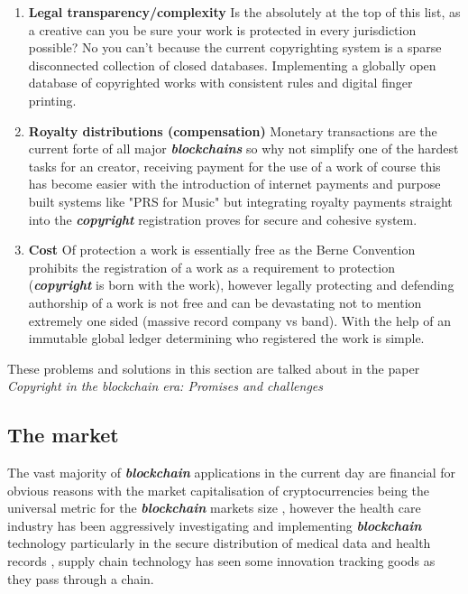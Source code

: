 \documentclass[12pt]{article}
\newcommand{\keyword}[1]{\textbf{\textit{#1}}}
\begin{document}
\begin{enumerate}
	\item \textbf{Legal transparency/complexity} Is the absolutely at the top of this list, as a creative can you be sure your work is protected in every jurisdiction possible? No you can't because the current copyrighting system is a sparse disconnected collection of closed databases. Implementing a globally open database of copyrighted works with consistent rules and digital finger printing. 
	\item \textbf{Royalty distributions (compensation)} Monetary transactions are the current forte of all major \keyword{blockchains} so why not simplify one of the hardest tasks for an creator, receiving payment for the use of a work of course this has become easier with the introduction of internet payments and purpose built systems like "PRS for Music" but integrating royalty payments straight into the \keyword{copyright} registration proves for secure and cohesive system.
	\item \textbf{Cost} Of protection a work is essentially free as the Berne Convention prohibits the registration of a work as a requirement to protection (\keyword{copyright} is born with the work), however legally protecting and defending authorship of a work is not free and can be devastating not to mention extremely one sided (massive record company vs band). With the help of an immutable global ledger determining who registered the work is simple. %
\end{enumerate}

These problems and solutions in this section are talked about in the paper \textit{Copyright in the blockchain era: Promises and challenges} \cite{Copyright_in_the_blockchain_era}


\subsection{The market}

The vast majority of \keyword{blockchain} applications in the current day are financial for obvious reasons with the market capitalisation of cryptocurrencies being the universal metric for the \keyword{blockchain} markets size \cite{wood_2021}, however the health care industry has been aggressively investigating and implementing \keyword{blockchain} technology particularly in the secure distribution of medical data and health records \cite{8167115}, supply chain technology has seen some innovation tracking goods as they pass through a chain. 
\end{document}
